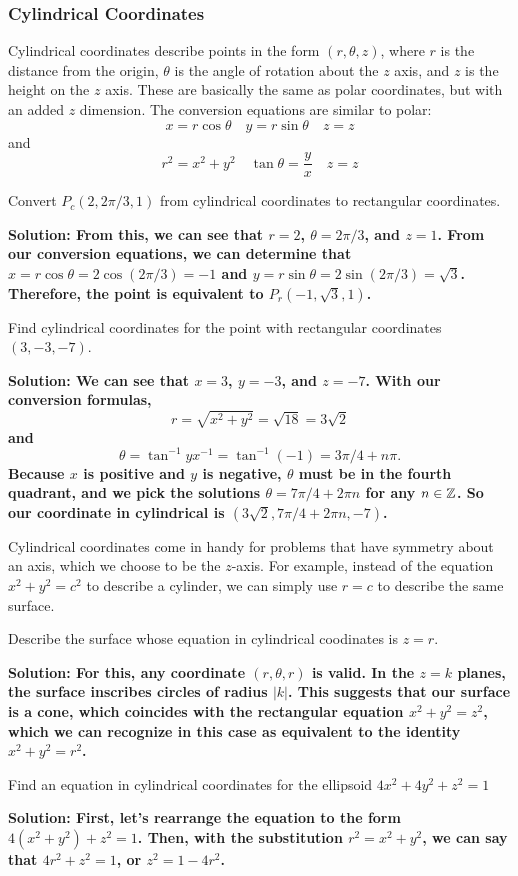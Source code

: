 \subsubsection{Cylindrical Coordinates}
Cylindrical coordinates describe points in the form \((r, \theta, z)\), where \(r\) is the distance from the origin, \(\theta\) is the angle of rotation about the \(z\) axis, and \(z\) is the height on the \(z\) axis. These are basically the same as polar coordinates, but with an added \(z\) dimension. The conversion equations are similar to polar:
\[x=r\cos\theta\quad y=r\sin\theta\quad z=z\]
and
\[r^2=x^2+y^2\quad \tan\theta = \frac{y}{x}\quad z=z\]
\begin{example}
    Convert \(P_c(2, 2\pi/3, 1)\) from cylindrical coordinates to rectangular coordinates.\par\bf{Solution: }From this, we can see that \(r=2\), \(\theta=2\pi/3\), and \(z=1\). From our conversion equations, we can determine that \(x=r\cos\theta = 2\cos(2\pi/3)=-1\) and \(y=r\sin\theta = 2\sin(2\pi/3)=\sqrt 3\). Therefore, the point is equivalent to \(P_r(-1, \sqrt 3, 1)\).
\end{example}
\begin{example}
    Find cylindrical coordinates for the point with rectangular coordinates \((3, -3, -7)\).
    \par\bf{Solution: }We can see that \(x=3\), \(y=-3\), and \(z=-7\). With our conversion formulas, \[r=\sqrt{x^2+y^2}=\sqrt{18}=3\sqrt 2\]and \[\theta = \tan^{-1}yx^{-1} = \tan^{-1}(-1)=3\pi/4+n\pi.\] Because \(x\) is positive and \(y\) is negative, \(\theta\) must be in the fourth quadrant, and we pick the solutions \(\theta=7\pi/4+2\pi n\) for any \(n\in\mathbb{Z}\). So our coordinate in cylindrical is \((3\sqrt 2, 7\pi/4+2\pi n, -7)\).
\end{example}
Cylindrical coordinates come in handy for problems that have symmetry about an axis, which we choose to be the \(z\)-axis. For example, instead of the equation \(x^2+y^2=c^2\) to describe a cylinder, we can simply use \(r=c\) to describe the same surface.
\begin{example}
    Describe the surface whose equation in cylindrical coodinates is \(z=r\).\par\bf{Solution: }For this, any coordinate \((r, \theta, r)\) is valid. In the \(z=k\) planes, the surface inscribes circles of radius \(|k|\). This suggests that our surface is a cone, which coincides with the rectangular equation \(x^2+y^2=z^2\), which we can recognize in this case as equivalent to the identity \(x^2+y^2=r^2\).
\end{example}
\begin{example}
    Find an equation in cylindrical coordinates for the ellipsoid \(4x^2+4y^2+z^2=1\)\par\bf{Solution: }First, let's rearrange the equation to the form \(4(x^2+y^2)+z^2=1\). Then, with the substitution \(r^2=x^2+y^2\), we can say that \(4r^2+z^2=1\), or \(z^2=1-4r^2\).
\end{example}
